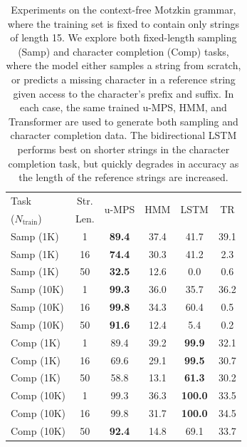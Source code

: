 \begin{table}[t]
\caption{Experiments on the context-free Motzkin grammar, where the training set is fixed to contain only strings of length 15. We explore both fixed-length sampling (Samp) and character completion (Comp) tasks, where the model either samples a string from scratch, or predicts a missing character in a reference string given access to the character's prefix and suffix. In each case, the same trained u-MPS, HMM, and Transformer are used to generate both sampling and character completion data. The bidirectional LSTM performs best on shorter strings in the character completion task, but quickly degrades in accuracy as the length of the reference strings are increased.}
\label{tab:motzkin}
\setlength\aboverulesep{0.1pt}
\setlength\belowrulesep{0.1pt}
\renewcommand{\arraystretch}{1.1}
\begin{center}
\begin{small}
\begin{sc}
\begin{tabular}{lc|cccc}
    Task & Str. & \multirow{2}{*}{u-MPS} & \multirow{2}{*}{HMM} & \multirow{2}{*}{LSTM} & \multirow{2}{*}{TR} \\
    ($N_{\mathrm{train}}$) & Len. &      &  &  &  \\
    \midrule
    Samp (1K)  & 1  & \textbf{89.4} & 37.4 & 41.7           & 39.1 \\
    Samp (1K)  & 16 & \textbf{74.4} & 30.3 & 41.2           & 2.3  \\
    Samp (1K)  & 50 & \textbf{32.5} & 12.6 & 0.0            & 0.6  \\
    Samp (10K) & 1  & \textbf{99.3} & 36.0 & 35.7           & 36.2 \\
    Samp (10K) & 16 & \textbf{99.8} & 34.3 & 60.4           & 0.5  \\
    Samp (10K) & 50 & \textbf{91.6} & 12.4 & 5.4            & 0.2  \\
    Comp (1K)  & 1  & 89.4          & 39.2 & \textbf{99.9}  & 32.1 \\
    Comp (1K)  & 16 & 69.6          & 29.1 & \textbf{99.5}  & 30.7 \\
    Comp (1K)  & 50 & 58.8          & 13.1 & \textbf{61.3}  & 30.2 \\
    Comp (10K) & 1  & 99.3          & 36.3 & \textbf{100.0} & 33.5 \\
    Comp (10K) & 16 & 99.8          & 31.7 & \textbf{100.0} & 34.5 \\
    Comp (10K) & 50 & \textbf{92.4} & 14.8 & 69.1           & 33.7 \\
    

\end{tabular}
\end{sc}
\end{small}
\end{center}
\end{table}
